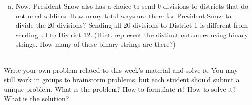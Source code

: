 \documentclass[]{article}
\newif\ifmotivation
\begin{document}
\begin{qunlist}
\begin{enumerate}[a)]
  \qpart
\item Now, President Snow also has a choice to send 0 divisions to districts that do not need soldiers. How many total ways are there for President Snow to divide the 20 divisions?  Sending all 20 divisions to District 1 is different from sending all to District 12. (Hint: represent the distinct outcomes using binary strings. How many of these binary strings are there?)
\end{enumerate}

\ifmotivation
{\motivation {Motivation - Stars and Bars problem.}}
\fi    






 \\
Write your own problem related to this week's material and solve it. You may still work in groups to brainstorm problems, but each student should submit a unique problem. What is the problem? How to formulate it? How to solve it? What is the solution?
  
  
    
\end{qunlist}
\end{document}
